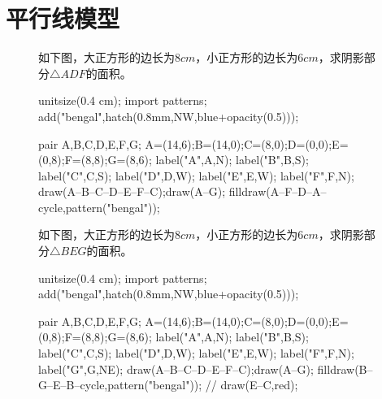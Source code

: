\documentclass[12pt,space]{ctexart} %
\begin{document}
\section{平行线模型}
\begin{figure}[ht]
	\centering
	\begin{minipage}[b]{0.45\textwidth}
		如下图，大正方形的边长为$8cm$，小正方形的边长为$6cm$，求阴影部分$\triangle ADF$的面积。\\
		\begin{asy}
			unitsize(0.4 cm);
			import patterns;
			add("bengal",hatch(0.8mm,NW,blue+opacity(0.5)));

			pair A,B,C,D,E,F,G;
			A=(14,6);B=(14,0);C=(8,0);D=(0,0);E=(0,8);F=(8,8);G=(8,6);
			label("A",A,N);
			label("B",B,S);
			label("C",C,S);
			label("D",D,W);
			label("E",E,W);
			label("F",F,N);
			draw(A--B--C--D--E--F--C);draw(A--G);
			filldraw(A--F--D--A--cycle,pattern("bengal"));
		\end{asy}
	\end{minipage}
	\qquad
	\begin{minipage}[b]{0.45\textwidth}
		如下图，大正方形的边长为$8cm$，小正方形的边长为$6cm$，求阴影部分$\triangle BEG$的面积。\\
		\begin{asy}
			unitsize(0.4 cm);
			import patterns;
			add("bengal",hatch(0.8mm,NW,blue+opacity(0.5)));

			pair A,B,C,D,E,F,G;
			A=(14,6);B=(14,0);C=(8,0);D=(0,0);E=(0,8);F=(8,8);G=(8,6);
			label("A",A,N);
			label("B",B,S);
			label("C",C,S);
			label("D",D,W);
			label("E",E,W);
			label("F",F,N);
			label("G",G,NE);
			draw(A--B--C--D--E--F--C);draw(A--G);
			filldraw(B--G--E--B--cycle,pattern("bengal"));
			// draw(E--C,red);
		\end{asy}
	\end{minipage}
\end{figure}
\vspace{1cm}
\end{document}
